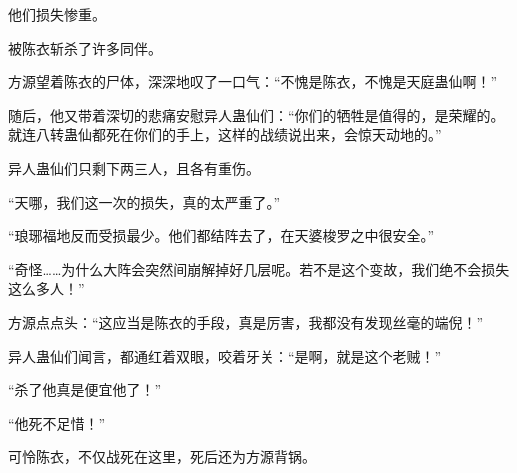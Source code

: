 \begin{this_body}
他们损失惨重。

被陈衣斩杀了许多同伴。

方源望着陈衣的尸体，深深地叹了一口气：“不愧是陈衣，不愧是天庭蛊仙啊！”

随后，他又带着深切的悲痛安慰异人蛊仙们：“你们的牺牲是值得的，是荣耀的。就连八转蛊仙都死在你们的手上，这样的战绩说出来，会惊天动地的。”

异人蛊仙们只剩下两三人，且各有重伤。

“天哪，我们这一次的损失，真的太严重了。”

“琅琊福地反而受损最少。他们都结阵去了，在天婆梭罗之中很安全。”

“奇怪……为什么大阵会突然间崩解掉好几层呢。若不是这个变故，我们绝不会损失这么多人！”

方源点点头：“这应当是陈衣的手段，真是厉害，我都没有发现丝毫的端倪！”

异人蛊仙们闻言，都通红着双眼，咬着牙关：“是啊，就是这个老贼！”

“杀了他真是便宜他了！”

“他死不足惜！”

可怜陈衣，不仅战死在这里，死后还为方源背锅。

\end{this_body}

